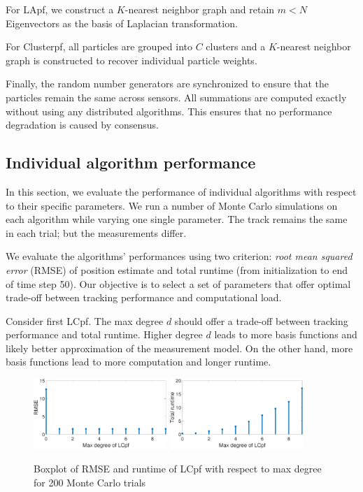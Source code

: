 \documentclass[10pt,letterpaper,final]{article}
\begin{document}
For LApf, we construct a $K$-nearest neighbor graph and retain $m< N$ Eigenvectors as the basis of Laplacian transformation. 

For Clusterpf, all particles are grouped into $C$ clusters and a $K$-nearest neighbor graph is constructed to recover individual particle weights. 

Finally, the random number generators are synchronized to ensure that the particles remain the same across sensors. All summations are computed exactly without using any distributed algorithms. This ensures that no performance degradation is caused by consensus.

\subsection{Individual algorithm performance}
In this section, we evaluate the performance of individual algorithms with respect to their specific parameters. We run a number of Monte Carlo simulations on each algorithm while varying one single parameter. The track remains the same in each trial; but the measurements differ. 

We evaluate the algorithms' performances using two criterion: \textit{root mean squared error} (RMSE) of position estimate and total runtime (from initialization to end of time step 50). Our objective is to select a set of parameters that offer optimal trade-off between tracking performance and computational load. 

Consider first LCpf. The max degree $d$ should offer a trade-off between tracking performance and total runtime. Higher degree $d$ leads to more basis functions and likely better approximation of the measurement model. On the other hand, more basis functions lead to more computation and longer runtime. 

\begin{figure}
\centering
\includegraphics[width=0.45\textwidth]{Figures/RMSE_maxDegree}
\includegraphics[width=0.45\textwidth]{Figures/runtime_maxDegree}
\caption{Boxplot of RMSE and runtime of LCpf with respect to max degree for 200 Monte Carlo trials}
\label{fig:results_maxDegree}
\end{figure}
\end{document}
